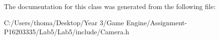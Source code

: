 The documentation for this class was generated from the following file\+:\begin{DoxyCompactItemize}
\item 
C\+:/\+Users/thoma/\+Desktop/\+Year 3/\+Game Engine/\+Assignment-\/\+P16203335/\+Lab5/\+Lab5/include/Camera.\+h\end{DoxyCompactItemize}
